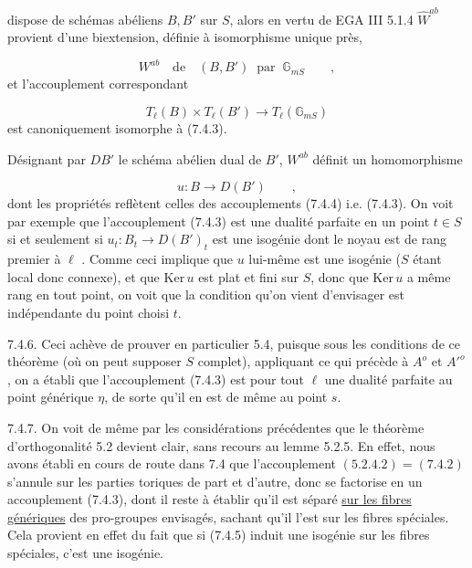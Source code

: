 
dispose de schémas abéliens $B,B'$ sur $S$, alors en vertu de EGA III 5.1.4 $\hat{W}^{ab}$ provient d'une biextension, définie à isomorphisme unique près,

\begin{equation*}
W^{ab} \quad \text{de} \quad (B,B') \;\; \text{par} \;\; \mathbb{G}_{mS} \qquad ,
\end{equation*}
et l'accouplement correspondant

\begin{equation}\tag{7.4.4}
T_{\ell}(B) \times T_{\ell}(B') \longrightarrow T_{\ell}(\mathbb{G}_{mS})
\end{equation}
est canoniquement isomorphe à (7.4.3).

Désignant par $DB'$ le schéma abélien dual de $B'$, $W^{ab}$ définit un homomorphisme

\begin{equation}\tag{7.4.5}
u : B \longrightarrow D(B') \qquad ,
\end{equation}
dont les propriétés reflètent celles des accouplements (7.4.4) i.e. (7.4.3). On voit par exemple que l'accouplement (7.4.3) est une dualité parfaite en un point $t \in S$ si et seulement si $u_{t} : B_{t} \longrightarrow D(B')_{t}$ est une isogénie dont le noyau est de rang premier à $\ell$ . Comme ceci implique que $u$ lui-même est une isogénie ($S$ étant local donc connexe), et que $\mathrm{Ker}\,u$ est plat et fini sur $S$, donc que $\mathrm{Ker}\,u$ a même rang en tout point, on voit que la condition qu'on vient d'envisager est indépendante du point choisi $t$.

7.4.6. Ceci achève de prouver en particulier 5.4, puisque sous les conditions de ce théorème (où on peut supposer $S$ complet), appliquant ce qui précède à $A^{o}$ et ${A'}^{o}$, on a établi que l'accouplement (7.4.3) est pour tout $\ell$ une dualité parfaite au point générique $\eta$, de sorte qu'il en est de même au point $s$.



7.4.7. On voit de même par les considérations précédentes que le théorème d'orthogonalité 5.2 devient clair, sans recours au lemme 5.2.5. En effet, nous avons établi en cours de route dans 7.4 que l'accouplement $(5.2.4.2)=(7.4.2)$ s'annule sur les parties toriques de part et d'autre, donc se factorise en un accouplement (7.4.3), dont il reste à établir qu'il est séparé \underline{sur les fibres génériques} des pro-groupes envisagés, sachant qu'il l'est sur les fibres spéciales. Cela provient en effet du fait que si (7.4.5) induit une isogénie sur les fibres spéciales, c'est une isogénie.

